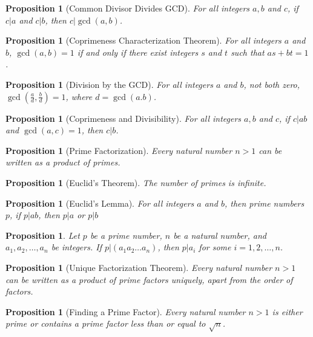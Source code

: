 \documentclass[10pt]{article}
\theoremstyle{break}
\newtheorem{prop}[thm]{Proposition}
\begin{document}
\begin{prop}[Common Divisor Divides GCD]
For all integers $a, b$ and $c$, if $c | a$ and $c | b$, then $c | \gcd(a,b)$.
\end{prop}

\begin{prop}[Coprimeness Characterization Theorem]
For all integers $a$ and $b$, $\gcd(a,b) = 1$ if and only if there exist integers $s$ and $t$ such that $as + bt = 1$.
\end{prop}

\begin{prop}[Division by the GCD]
For all integers $a$ and $b$, not both zero, $\gcd (\frac{a}{d}, \frac{b}{d}) = 1$, where $d = \gcd(a.b)$.
\end{prop}


\begin{prop}[Coprimeness and Divisibility]
For all integers $a, b$ and $c$, if $c | ab$ and $\gcd(a,c) = 1$, then $c | b$.
\end{prop}

\begin{prop}[Prime Factorization]
Every natural number $n > 1$ can be written as a product of primes.
\end{prop}

\begin{prop}[Euclid's Theorem]
The number of primes is infinite.
\end{prop}

\begin{prop}[Euclid's Lemma]
For all integers $a$ and $b$, then prime numbers $p$, if $p | ab$, then $p | a$ or $p | b$
\end{prop}

\begin{prop}
Let $p$ be a prime number, $n$ be a natural number, and $a_1, a_2, \dots, a_n$ be integers. If $p | (a_1a_2 \dots a_n)$, then $p | a_i$ for some $i = 1,2,\dots, n$.
\end{prop}

\begin{prop}[Unique Factorization Theorem]
Every natural number $n > 1$ can be written as a product of prime factors uniquely, apart
from the order of factors.
\end{prop}

\begin{prop}[Finding a Prime Factor]
Every natural number $n > 1$ is either prime or contains a prime factor less than or equal
to $\sqrt{n}$.
\end{prop}
\end{document}
